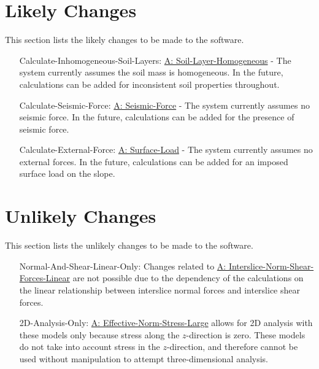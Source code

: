 \documentclass[12pt]{article}
\begin{document}
\section{Likely Changes}
\label{Sec:LCs}
This section lists the likely changes to be made to the software.
\begin{itemize}
\item[Calculate-Inhomogeneous-Soil-Layers:\phantomsection\label{LC_inhomogeneous}]\hyperref[assumpSLH]{A: Soil-Layer-Homogeneous} - The system currently assumes the soil mass is homogeneous. In the future, calculations can be added for inconsistent soil properties throughout.
\item[Calculate-Seismic-Force:\phantomsection\label{LC_seismic}]\hyperref[assumpSF]{A: Seismic-Force} - The system currently assumes no seismic force. In the future, calculations can be added for the presence of seismic force.
\item[Calculate-External-Force:\phantomsection\label{LC_external}]\hyperref[assumpSL]{A: Surface-Load} - The system currently assumes no external forces. In the future, calculations can be added for an imposed surface load on the slope.
\end{itemize}
\section{Unlikely Changes}
\label{Sec:UCs}
This section lists the unlikely changes to be made to the software.
\begin{itemize}
\item[Normal-And-Shear-Linear-Only:\phantomsection\label{UC_normshearlinear}]Changes related to \hyperref[assumpINSFL]{A: Interslice-Norm-Shear-Forces-Linear} are not possible due to the dependency of the calculations on the linear relationship between interslice normal forces and interslice shear forces.
\item[2D-Analysis-Only:\phantomsection\label{UC_2donly}]\hyperref[assumpENSL]{A: Effective-Norm-Stress-Large} allows for 2D analysis with these models only because stress along the $z$-direction is zero. These models do not take into account stress in the $z$-direction, and therefore cannot be used without manipulation to attempt three-dimensional analysis.
\end{itemize}
\end{document}
